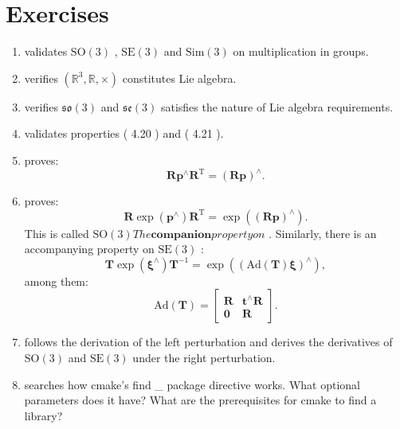 \section*{ Exercises}
\begin{enumerate}
	\item validates $ \mathrm {SO}(3) $ , $ \mathrm {SE}(3) $ and $ \mathrm {Sim}(3) $ on multiplication in groups.
	\item verifies $ ( \mathbb {R}^3, \mathbb {R}, \times ) $ constitutes Lie algebra.
	\item verifies $ \mathfrak {so}(3) $ and $ \mathfrak {se}(3) $ satisfies the nature of Lie algebra requirements.
	\item validates properties ( 4.20 ) and ( 4.21 ).
	\item proves: \[
	\bm{R} \bm{p}^\wedge \bm{R}^\mathrm{T} = (\bm{Rp})^\wedge .\]
	\item proves: \[
	\bm {R} \exp ( \bm {p}^ \wedge ) \bm {R}^ \mathrm {T} = \exp ( ( \bm {Rp})^ \wedge ). \] This is called $ \mathrm {SO}(3) The \textbf {companion} property on $ . Similarly, there is an accompanying property on $ \mathrm {SE}(3) $ :
	\begin{equation}
	\bm{T} \exp(\boldsymbol{\xi}^\wedge)\bm{T}^{-1} = \exp \left( \left( \mathrm{Ad}(\bm{T}) \boldsymbol{\xi} \right) ^\wedge \right),
	\end{equation}
	among them:
	\begin{equation}
	\label{eq:adjSE3}
	\mathrm{Ad} ( \bm{T} ) = \left[ {\begin{array}{*{20}{c}}
		\bm{R} &{{ \bm{t} ^ \wedge } \bm{R} }\\
		\bm{0} & \bm{R}
		\end{array}} \right].
	\end{equation}
	\item follows the derivation of the left perturbation and derives the derivatives of $ \mathrm {SO}(3) $ and $ \mathrm {SE}(3) $ under the right perturbation.
	\item searches how cmake's find \_ package directive works. What optional parameters does it have? What are the prerequisites for cmake to find a library?
\end{enumerate}
